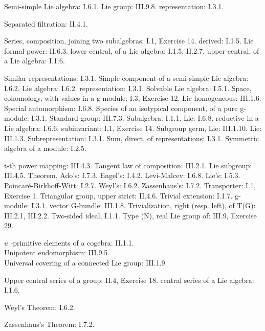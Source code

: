 Semi-simple Lie algebra: I.6.1. Lie group: III.9.8. representation: I.3.1.

Separated filtration: II.4.1.

Series, composition, joining two subalgebras: I.1, Exercise 14. derived: I.1.5. Lie formal power: II.6.3. lower central, of a Lie algebra: I.1.5, II.2.7. upper central, of a Lie algebra: I.1.6.

Similar representations: I.3.1. Simple component of a semi-simple Lie algebra: I.6.2. Lie algebra: I.6.2. representation: I.3.1. Solvable Lie algebra: I.5.1. Space, cohomology, with values in a g-module: I.3, Exercise 12. Lie homogeneous: III.1.6. Special automorphism: I.6.8. Species of an isotypical component, of a pure g-module: I.3.1. Standard group: III.7.3. Subalgebra: I.1.1. Lie: I.6.8. reductive in a Lie algebra: I.6.6. subinvariant: I.1, Exercise 14. Subgroup germ, Lie: III.1.10. Lie: III.1.3. Subrepresentation: I.3.1. Sum, direct, of representations: I.3.1. Symmetric algebra of a module: I.2.5.

t-th power mapping: III.4.3. Tangent law of composition: III.2.1. Lie subgroup: III.4.5. Theorem, Ado's: I.7.3. Engel's: I.4.2. Levi-Malcev: I.6.8. Lie's: I.5.3. Poincaré-Birkhoff-Witt: I.2.7. Weyl's: I.6.2. Zassenhaus's: I.7.2. Transporter: I.1, Exercise 1. Triangular group, upper strict: II.4.6. Trivial extension: I.1.7. g-module: I.3.1. vector G-bundle: III.1.8. Trivialization, right (resp. left), of T(G): III.2.1, III.2.2. Two-sided ideal, I.1.1. Type (N), real Lie group of: III.9, Exercise 29.

\(u\) -primitive elements of a cogebra: II.1.1.\\
Unipotent endomorphism: III.9.5.\\
Universal covering of a connected Lie group: III.1.9.

Upper central series of a group: II.4, Exercise 18. central series of a Lie algebra: I.1.6.

Weyl's Theorem: I.6.2.

Zassenhaus's Theorem: I.7.2.

